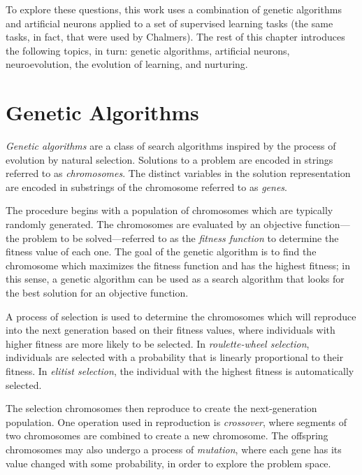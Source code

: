 \documentclass[master]{outhesis}
\begin{document}
To explore these questions, this work uses a combination of genetic algorithms and artificial neurons applied to a set of supervised learning tasks (the same tasks, in fact, that were used by Chalmers). The rest of this chapter introduces the following topics, in turn: genetic algorithms, artificial neurons, neuroevolution, the evolution of learning, and nurturing.

\section{Genetic Algorithms}


\emph{Genetic algorithms} are a class of search algorithms inspired by the process of evolution by natural selection.
Solutions to a problem are encoded in strings referred to as \emph{chromosomes}.
The distinct variables in the solution representation are encoded in substrings of the chromosome referred to as \emph{genes}.

The procedure begins with a population of chromosomes which are typically randomly generated.
The chromosomes are evaluated by an objective function---the problem to be solved---referred to as the \emph{fitness function} to determine the fitness value of each one.
The goal of the genetic algorithm is to find the chromosome which maximizes the fitness function and has the highest fitness;
in this sense, a genetic algorithm can be used as a search algorithm that looks for the best solution for an objective function.

A process of selection is used to determine the chromosomes which will reproduce into the next generation based on their fitness values,
 where individuals with higher fitness are more likely to be selected.
 In \emph{roulette-wheel selection}, individuals are selected with a probability that is linearly proportional to their fitness.
 In \emph{elitist selection}, the individual with the highest fitness is automatically selected.

The selection chromosomes then reproduce to create the next-generation population.
One operation used in reproduction is \emph{crossover}, where segments of two chromosomes are combined to create a new chromosome.
The offspring chromosomes may also undergo a process of \emph{mutation}, where each gene has its value changed with some probability, in order to explore the problem space. 
\end{document}
